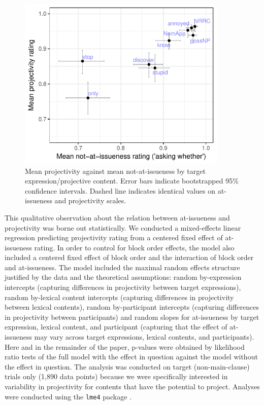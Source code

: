 \documentclass[11pt,fleqn]{article}
\newcommand{\6}{\mbox{$[\hspace*{-.6mm}[$}}
\newcommand{\9}{\mbox{$]\hspace*{-.6mm}]$}}
\begin{document}
\begin{figure}[!h]

\begin{center}
\includegraphics[width=10cm]{../results/exp1a/graphs/ai-proj-bytrigger-labels}
\end{center}

\caption{Mean projectivity against mean not-at-issueness by target expression/projective content. Error bars indicate bootstrapped 95\% confidence intervals. Dashed line indicates identical values on at-issueness and projectivity scales.}
\label{fig:f-proj-ai-1a}
\end{figure}

This qualitative observation about the relation between at-issueness and projectivity was borne out statistically. We conducted a mixed-effects linear regression predicting projectivity rating from a centered fixed effect of at-issueness rating. In order to control for block order effects, the model also included a centered fixed effect of block order and the interaction of block order and at-issueness. The model included the maximal random effects structure justified by the data and the theoretical assumptions: random by-expression intercepts (capturing differences in projectivity between target expressions),  random by-lexical content intercepts (capturing differences in projectivity between lexical contents), random by-participant intercepts (capturing differences in projectivity between participants) and random slopes for at-issueness by target expression, lexical content, and participant (capturing that the effect of at-issueness may vary across target expressions, lexical contents, and participants). Here and in the remainder of the paper, p-values were obtained by likelihood ratio tests of the full model with the effect in question against the model without the effect in question. The analysis was conducted on target (non-main-clause) trials only (1,890 data points) because we were specifically interested in variability in projectivity for contents that have the potential to project. Analyses were conducted using the \verb|lme4| package \citep{bates2015}.
\end{document}

